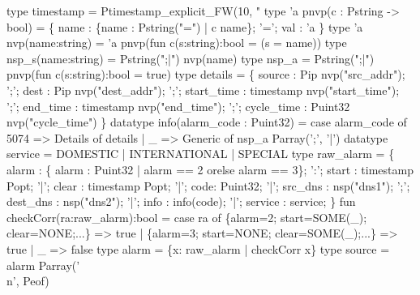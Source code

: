 \begin{code}
type timestamp = Ptimestamp_explicit_FW(10, "%
\mbox{}
type 'a pnvp(c : Pstring -> bool) =
      \{ name : \{name : Pstring("=") | c name\};
        '=';
        val : 'a \}
type 'a nvp(name:string) = 'a pnvp(fun c(s:string):bool = (s = name))
type nsp_s(name:string) = Pstring(";|") nvp(name)
type nsp_a = Pstring(";|") pnvp(fun c(s:string):bool = true)
\mbox{}
type details = \{
      source      : Pip nvp("src_addr");
';';  dest        : Pip nvp("dest_addr");
';';  start_time  : timestamp nvp("start_time");
';';  end_time    : timestamp nvp("end_time");
';';  cycle_time  : Puint32 nvp("cycle_time")
\}
\mbox{}
datatype info(alarm_code : Puint32) =
  case alarm_code of 
    5074 => Details of details
  | _    => Generic of nsp_a Parray(';', '|')
\mbox{}
datatype service =
    DOMESTIC
  | INTERNATIONAL
  | SPECIAL
\mbox{}
type raw_alarm = \{
       alarm    :  \{ alarm : Puint32 | alarm == 2 orelse alarm == 3\};
 ':';  start :  timestamp Popt;
 '|';  clear :  timestamp Popt;
 '|';  code: Puint32;
 '|';  src_dns  :  nsp("dns1");
 ';';  dest_dns :  nsp("dns2");
 '|';  info     :  info(code);
 '|';  service  :  service;
\}
\mbox{}
fun checkCorr(ra:raw_alarm):bool =
  case ra of 
    \{alarm=2; start=SOME(_); clear=NONE;...\} => true
  | \{alarm=3; start=NONE;    clear=SOME(_);...\} => true
  |  _ => false
\mbox{}
type alarm = \{x: raw_alarm | checkCorr x\}
\mbox{}
type source = alarm Parray('\\n', Peof)
\end{code}
